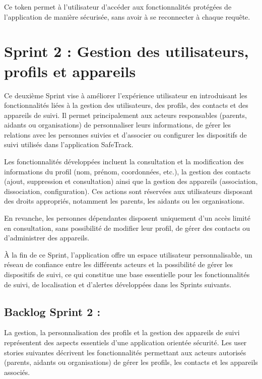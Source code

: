 Ce token permet à l'utilisateur d'accéder aux fonctionnalités protégées de l'application de manière sécurisée, sans avoir à se reconnecter à chaque requête.


\section{Sprint 2 : Gestion des utilisateurs, profils et appareils}

Ce deuxième Sprint vise à améliorer l'expérience utilisateur en introduisant les fonctionnalités liées à la gestion des utilisateurs, des profils, des contacts et des appareils de suivi. Il permet principalement aux acteurs responsables (parents, aidants ou organisations) de personnaliser leurs informations, de gérer les relations avec les personnes suivies et d'associer ou configurer les dispositifs de suivi utilisés dans l'application SafeTrack.

Les fonctionnalités développées incluent la consultation et la modification des informations du profil (nom, prénom, coordonnées, etc.), la gestion des contacts (ajout, suppression et consultation) ainsi que la gestion des appareils (association, dissociation, configuration). Ces actions sont réservées aux utilisateurs disposant des droits appropriés, notamment les parents, les aidants ou les organisations.

En revanche, les personnes dépendantes disposent uniquement d'un accès limité en consultation, sans possibilité de modifier leur profil, de gérer des contacts ou d'administrer des appareils.

À la fin de ce Sprint, l'application offre un espace utilisateur personnalisable, un réseau de confiance entre les différents acteurs et la possibilité de gérer les dispositifs de suivi, ce qui constitue une base essentielle pour les fonctionnalités de suivi, de localisation et d'alertes développées dans les Sprints suivants.



\subsection{Backlog Sprint 2 :}

La gestion, la personnalisation des profils et la gestion des appareils de suivi représentent des aspects essentiels d'une application orientée sécurité. Les user stories suivantes décrivent les fonctionnalités permettant aux acteurs autorisés (parents, aidants ou organisations) de gérer les profils, les contacts et les appareils associés.

